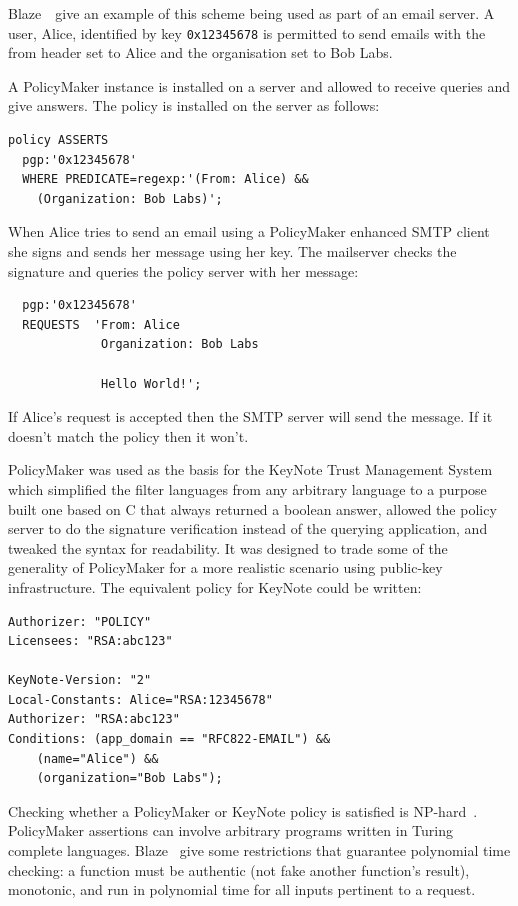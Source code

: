 \documentclass[thesis.tex]{subfiles}
\begin{document}
Blaze~\etal~give an example of this scheme being used as part of an email
server. A user, Alice, identified by key \texttt{0x12345678} is permitted to
send emails with the from header set to Alice and the organisation set to Bob
Labs.

A PolicyMaker instance is installed on a server and allowed to receive queries and give answers.
The policy is installed on the server as follows:

\begin{lstlisting}
policy ASSERTS
  pgp:'0x12345678'
  WHERE PREDICATE=regexp:'(From: Alice) &&
    (Organization: Bob Labs)';
\end{lstlisting}

When Alice tries to send an email using a PolicyMaker enhanced SMTP
client she signs and sends her message using her key.  The mailserver
checks the signature and queries the policy server with her message:

\begin{lstlisting}
  pgp:'0x12345678'
  REQUESTS  'From: Alice
             Organization: Bob Labs

             Hello World!';
\end{lstlisting}

If Alice's request is accepted then the SMTP server will send the
message.  If it doesn't match the policy then it won't.

PolicyMaker was used as the basis for the KeyNote Trust Management
System~\cite{blaze_role_1999,blaze_keynote:_1998} which simplified the
filter languages from any arbitrary language to a purpose built one
based on C that always returned a boolean answer, allowed the policy
server to do the signature verification instead of the querying
application, and tweaked the syntax for readability.  It was designed
to trade some of the generality of PolicyMaker for a more realistic
scenario using public-key infrastructure.  The equivalent policy for KeyNote could be written:

\begin{lstlisting}
Authorizer: "POLICY"
Licensees: "RSA:abc123"

KeyNote-Version: "2"
Local-Constants: Alice="RSA:12345678" 
Authorizer: "RSA:abc123"
Conditions: (app_domain == "RFC822-EMAIL") &&
    (name="Alice") &&
    (organization="Bob Labs");
\end{lstlisting}

Checking whether a PolicyMaker or KeyNote policy is satisfied is
NP-hard~\cite{blaze_compliance_1998}. PolicyMaker assertions can involve
arbitrary programs written in Turing complete languages. Blaze~\etal{} give some restrictions that
guarantee polynomial time checking: a function must be authentic (not fake
another function's result), monotonic, and run in polynomial time for all inputs
pertinent to a request.
\end{document}

